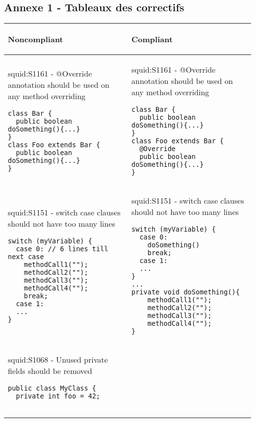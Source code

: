 \documentclass[a4paper]{article}
\begin{document}
\newpage
\appendix
\begin{center}
	\section{Annexe 1 - Tableaux des correctifs}
	\label{annexe1}
	\begin{tabular}{|p{}|p{}|}
  	\hline
	  	\begin{center}
	  	 Noncompliant
	  	 \end{center} & 
	  	 \begin{center}
	  	 Compliant
	  	 \end{center} \\
  	\hline
  	\begin{center}
  	squid:S1161 - @Override annotation should be used on any method overriding
  	\end{center}
	\begin{lstlisting}
class Bar {
  public boolean doSomething(){...}
}
class Foo extends Bar {
  public boolean doSomething(){...}
}
  	\end{lstlisting} 
   	& 
   	\begin{center}
  	squid:S1161 - @Override annotation should be used on any method overriding
  	\end{center}
   	\begin{lstlisting}
class Bar {
  public boolean doSomething(){...}
}
class Foo extends Bar {
  @Override
  public boolean doSomething(){...}
}
  	\end{lstlisting}  \\
  	\hline
  	\begin{center}
  	squid:S1151 - switch case clauses should not have too many lines
  	\end{center}
	\begin{lstlisting}
switch (myVariable) {
  case 0: // 6 lines till next case
    methodCall1("");
    methodCall2("");
    methodCall3("");
    methodCall4("");
    break;
  case 1:
  ...
}
  	\end{lstlisting} 
   	&
   	\begin{center}
  	squid:S1151 - switch case clauses should not have too many lines
  	\end{center} 
   	\begin{lstlisting}
switch (myVariable) {
  case 0:                  
    doSomething()
    break;
  case 1:
  ...
}
...
private void doSomething(){
    methodCall1("");
    methodCall2("");
    methodCall3("");
    methodCall4("");
} 
  	\end{lstlisting}  \\
  	\hline
  	\begin{center}
  	squid:S1068 - Unused private fields should be removed
  	\end{center} 
	\begin{lstlisting}
public class MyClass {
  private int foo = 42;


\end{lstlisting}
\end{tabular}
\end{center}
\end{document}

